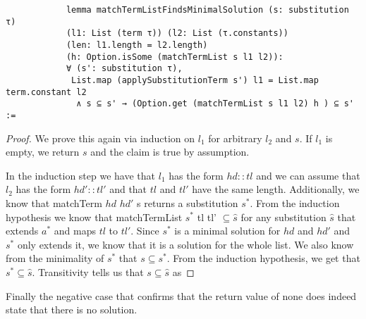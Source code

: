 \documentclass{article}
\begin{document}
        \begin{lstlisting}
            lemma matchTermListFindsMinimalSolution (s: substitution τ)
            (l1: List (term τ)) (l2: List (τ.constants)) 
            (len: l1.length = l2.length) 
            (h: Option.isSome (matchTermList s l1 l2)):
            ∀ (s': substitution τ), 
             List.map (applySubstitutionTerm s') l1 = List.map term.constant l2
              ∧ s ⊆ s' → (Option.get (matchTermList s l1 l2) h ) ⊆ s' :=
        \end{lstlisting}
        \begin{proof}
            We prove this again via induction on $l_1$ for arbitrary $l_2$ and $s$. If $l_1$ is empty, we return $s$ and the claim is true by assumption.

            In the induction step we have that $l_1$ has the form $hd::tl$ and we can assume that $l_2$ has the form $hd'::tl'$ and that $tl$ and $tl'$ have the same length. Additionally, we know that matchTerm $hd$ $hd'$ s returns a substitution $s^\ast$. From the induction hypothesis we know that matchTermList $s^\ast$ tl tl' $\subseteq \hat{s}$ for any substitution $\hat{s}$ that extends $a^\ast$ and maps $tl$ to $tl'$. Since $s^\ast$ is a minimal solution for $hd$ and $hd'$ and $s^\ast$ only extends it, we know that it is a solution for the whole list. We also know from the minimality of $s^\ast$ that $s \subseteq s^\ast$. From the induction hypothesis, we get that $s^\ast \subseteq \hat{s}$. Transitivity tells us that $s \subseteq \hat{s}$ as 
        \end{proof}

        Finally the negative case that confirms that the return value of none does indeed state that there is no solution.
\end{document}
